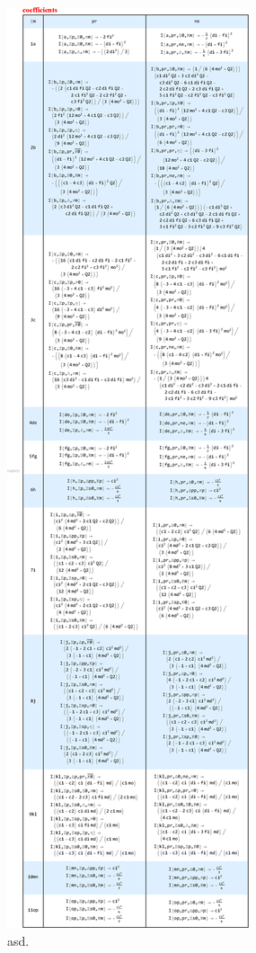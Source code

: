 \documentclass[UTF8]{article}
\begin{document}
\begin{figure}[htbp]
	\centering
	\includegraphics[height=\textheight,width=\textwidth]{coe.all.eps}
	\caption{asd.}
	\label{fig:loop8}
\end{figure}
\end{document}
